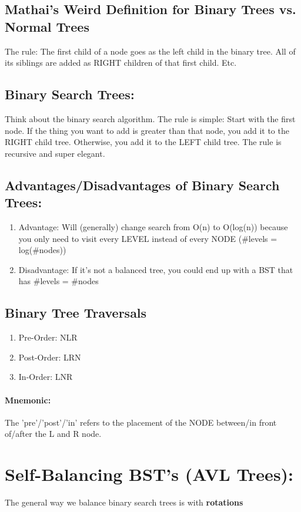 \documentclass[a4paper,12pt]{report}
\begin{document}
\subsection{Mathai's Weird Definition for Binary Trees vs. Normal Trees}
The rule: The first child of a node goes as the left child in the binary tree. All of its siblings are added as RIGHT children of that first child. Etc.
\subsection{Binary Search Trees: }
Think about the binary search algorithm. The rule is simple: Start with the first node. If the thing you want to add is greater than that node, you add it to the RIGHT child tree. Otherwise, you add it to the LEFT child tree. The rule is recursive and super elegant.
\subsection{Advantages/Disadvantages of Binary Search Trees: }
\begin{enumerate}
\item Advantage: Will (generally) change search from O(n) to O(log(n)) because you only need to visit every LEVEL instead of every NODE (\#levels = log(\#nodes))
\item Disadvantage: If it's not a balanced tree, you could end up with a BST that has \#levels = \#nodes
\end{enumerate}

\subsection{Binary Tree Traversals}
\begin{enumerate}
\item Pre-Order: NLR
\item Post-Order: LRN
\item In-Order: LNR
\end{enumerate}
\paragraph{Mnemonic: } The 'pre'/'post'/'in' refers to the placement of the NODE between/in front of/after the L and R node.

\section{Self-Balancing BST's (AVL Trees): }
The general way we balance binary search trees is with \textbf{rotations}
\end{document}
